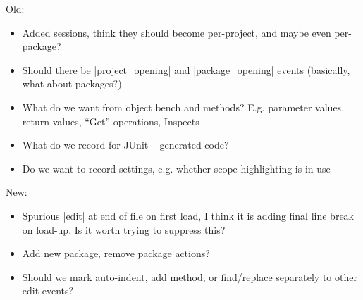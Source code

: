 \documentclass{book}
\begin{document}
Old:
\begin{itemize}
\item Added sessions, think they should become per-project, and maybe even per-package?
\item Should there be |project_opening| and |package_opening| events
  (basically, what about packages?)
\item What do we want from object bench and methods?  E.g. parameter values,
  return values, ``Get'' operations, Inspects
\item What do we record for JUnit -- generated code?
\item Do we want to record settings, e.g. whether scope highlighting is in
  use
\end{itemize}

New:
\begin{itemize}
\item Spurious |edit| at end of file on first load, I think it is adding final
  line break on load-up.  Is it worth trying to suppress this?
\item Add new package, remove package actions?
\item Should we mark auto-indent, add method, or find/replace separately to other edit events?
\end{itemize}
\end{document}
